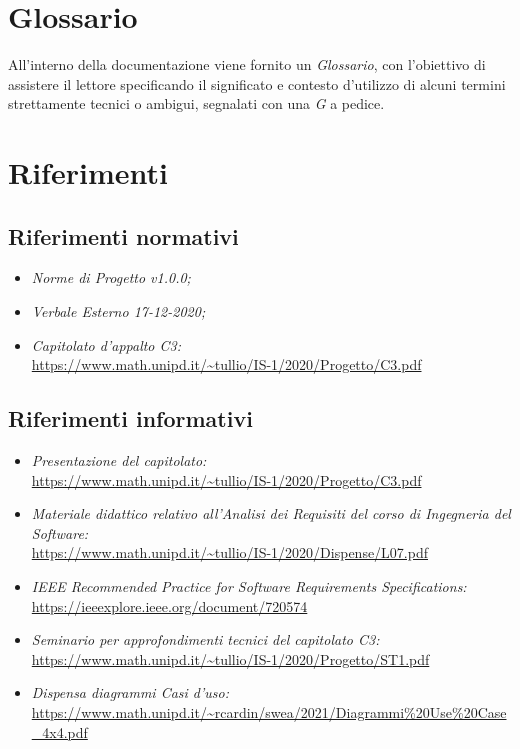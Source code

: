 \section{Glossario}\label{IntroduzioneGlossario}
All'interno della documentazione viene fornito un \textit{Glossario}, con l'obiettivo di assistere il lettore specificando il significato e contesto d'utilizzo di alcuni termini strettamente tecnici o ambigui, segnalati con una \textit{G} a pedice.

\section{Riferimenti}\label{IntroduzioneRiferimenti}
\subsection{Riferimenti normativi}\label{IntroduzioneRiferimentiRiferimentiNormativi}
\begin{itemize}
	\item \textit{Norme di Progetto v1.0.0;}
		\item \textit{Verbale Esterno 17-12-2020;}
		\item \textit{Capitolato d'appalto C3:} \\ \url{https://www.math.unipd.it/~tullio/IS-1/2020/Progetto/C3.pdf}
\end{itemize}
\subsection{Riferimenti informativi}\label{IntroduzioneRiferimentiRiferimentiInformativi}
\begin{itemize}
	\item \textit{Presentazione del capitolato:} \\ \url{https://www.math.unipd.it/~tullio/IS-1/2020/Progetto/C3.pdf}
		\item \textit{Materiale didattico relativo all'Analisi dei Requisiti del corso di Ingegneria del Software:}\\ \url{https://www.math.unipd.it/~tullio/IS-1/2020/Dispense/L07.pdf}
	\item \textit{IEEE Recommended Practice for Software Requirements Specifications:}\\
		\url{https://ieeexplore.ieee.org/document/720574}
	\item \textit{Seminario per approfondimenti tecnici del capitolato C3:}\\
		\url{https://www.math.unipd.it/~tullio/IS-1/2020/Progetto/ST1.pdf}
	\item \textit{Dispensa diagrammi Casi d'uso:}\\
		\url{https://www.math.unipd.it/~rcardin/swea/2021/Diagrammi\%20Use\%20Case_4x4.pdf}
\end{itemize}
